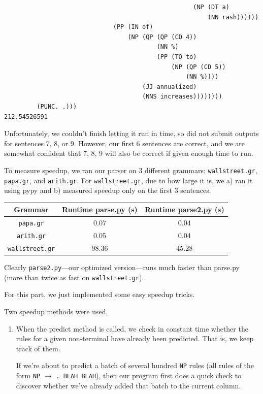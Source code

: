 \documentclass[11pt]{article}
\begin{document}
\begin{enumerate}
\begin{lstlisting}
                                                    (NP (DT a)
                                                        (NN rash))))))
                              (PP (IN of)
                                  (NP (QP (QP (CD 4))
                                          (NN %)
                                          (PP (TO to)
                                              (NP (QP (CD 5))
                                                  (NN %))))
                                      (JJ annualized)
                                      (NNS increases))))))))
         (PUNC. .)))
212.54526591
	\end{lstlisting}
	Unfortunately, we couldn't finish letting it run in time, so did not submit outputs for sentences 7, 8, or 9. However, our first 6 sentences are correct, and we are somewhat confident that 7, 8, 9 will also be correct if given enough time to run.

	To measure speedup, we ran our parser on 3 different grammars: \texttt{wallstreet.gr}, \texttt{papa.gr}, and \texttt{arith.gr}. For \texttt{wallstreet.gr}, due to how large it is, we a) ran it using pypy and b) measured speedup only on the first 3 sentences.

	\begin{center}
	\begin{tabular}{|c|c|c|}
	\hline 
	Grammar & Runtime parse.py (s) & Runtime parse2.py (s) \\ 
	\hline 
	\texttt{papa.gr} & 0.07 & 0.04 \\ 
	\hline 
	\texttt{arith.gr} & 0.05 & 0.04 \\ 
	\hline 
	\texttt{wallstreet.gr} & 98.36 & 45.28 \\ 
	\hline
	\end{tabular} 
	\end{center}

	Clearly \texttt{parse2.py}---our optimized version---runs much faster than parse.py (more than twice as fast on \texttt{wallstreet.gr}). 

	For this part, we just implemented some easy speedup tricks.

	Two speedup methods were used.
	\begin{enumerate}
		\item
			When the predict method is called, we check in constant time whether the rules for a given non-terminal have already been predicted. That is, we keep track of them. 

			If we're about to predict a batch of several hundred \texttt{NP} rules (all rules of the form \texttt{NP} $\to$ \texttt{. BLAH BLAH}), then our program first does a quick check to discover whether we've already added that batch to the current column.


\end{enumerate}
\end{enumerate}
\end{document}
